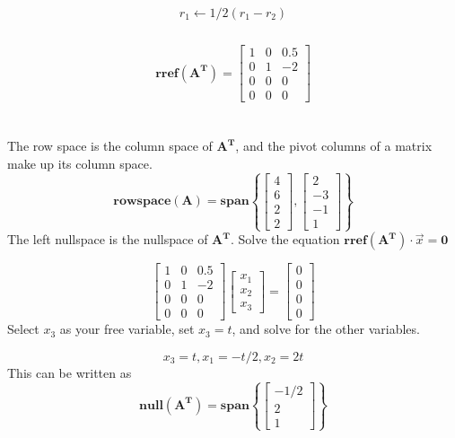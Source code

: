 \begin{enumerate}
{$$\begin{matrix}
    r_1 \gets 1/2(r_1-r_2) \\
      \\ 
       \\
       \\
\end{matrix}
 $$
$$
\mathbf{rref(A^T)} = 
\begin{bmatrix}
  1 & 0 & 0.5 \\
  0 & 1 & -2 \\
  0 & 0 & 0 \\
  0 & 0 & 0
 \end{bmatrix}
$$
 \\ \\
 The row space is the column space of $\mathbf{A^T}$, and the pivot columns of a matrix make up its column space.
    $$\mathbf{rowspace(A) = span}
    \left\{
    \begin{bmatrix}
    4 \\ 6 \\ 2 \\ 2
    \end{bmatrix}, 
    \begin{bmatrix} 
    2 \\ -3 \\ -1 \\ 1
    \end{bmatrix}
    \right \}$$
The left nullspace is the nullspace of $\mathbf{A^T}$. Solve the equation $\mathbf{rref(A^T)} \cdot \vec{x} = \mathbf{0}$

$$ \begin{bmatrix}
  1 & 0 & 0.5 \\
  0 & 1 & -2 \\
  0 & 0 & 0 \\
  0 & 0 & 0
 \end{bmatrix}
 \begin{bmatrix}
  x_1 \\
  x_2 \\
  x_3
 \end{bmatrix} = 
 \begin{bmatrix}
  0 \\
  0 \\
  0 \\
  0
 \end{bmatrix}
 $$
Select $x_3$ as your free variable, set $x_3 = t$, and solve for the other variables.

$$
x_3 = t, x_1 = -t/2, x_2 = 2t
$$
This can be written as
$$ 
\mathbf{null(A^T) = span}
\left\{
\begin{bmatrix}
-1/2 \\ 2 \\ 1 
\end{bmatrix}
\right\}
$$
}


\end{enumerate}
